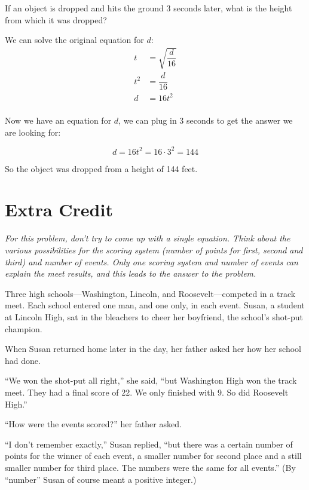 \documentclass[fleqn,addpoints]{exam}
\begin{document}
\begin{questions}
If an object is dropped and hits the ground 3 seconds later, what is the height from which it was dropped?

\begin{solution}

We can solve the original equation for $d$:
\begin{align*}
  t &= \sqrt{\dfrac{d}{16}} \\
  t^2 &= \dfrac{d}{16} \\
  d &= 16t^2 \\
\end{align*}

Now we have an equation for $d$, we can plug in 3 seconds to get the answer we are looking for:

\[
  d = 16t^2 = 16 \cdot 3^2 = 144
\]

So the object was dropped from a height of 144 feet.

\end{solution}

\section{Extra Credit}

{\em For this problem, don't try to come up with a single equation.  Think about the various possibilities for the
  scoring system (number of points for first, second and third) and number of events.  Only one scoring system and
  number of events can explain the meet results, and this leads to the answer to the problem.}

\vspace{0.5 cm}

Three high schools---Washington, Lincoln, and Roosevelt---competed in a track meet.  Each school entered one man, and one
only, in each event.  Susan, a student at Lincoln High, sat in the bleachers to cheer her boyfriend, the school's
shot-put champion.

When Susan returned home later in the day, her father asked her how her school had done.

``We won the shot-put all right,'' she said, ``but Washington High won the track meet.  They had a final score of 22.
We only finished with 9.  So did Roosevelt High.''

``How were the events scored?'' her father asked.

``I don't remember exactly,'' Susan replied, ``but there was a certain number of points for the winner of each event, a
smaller number for second place and a still smaller number for third place.  The numbers were the same for all events.''
(By ``number'' Susan of course meant a positive integer.)


\end{questions}
\end{document}

